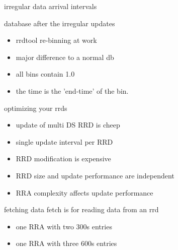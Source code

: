 \begin{frame}{irregular data arrival intervals}

\end{frame}


\begin{frame}{database after the irregular updates}



\begin{itemize}
\item rrdtool re-binning at work
\item major difference to a normal db
\item all bins contain 1.0
\item the time is the 'end-time' of the bin.
\end{itemize}
\end{frame}

\begin{frame}{optimizing your rrds}
\begin{itemize}
\item update of multi DS RRD is cheep
\item single update interval per RRD
\item RRD modification is expensive
\item RRD size and update performance are independent
\item RRA complexity affects update performance
\end{itemize}
\end{frame}



\begin{frame}{fetching data}
fetch is for reading data from an rrd

\begin{itemize}
\item one RRA with two 300s entries
\item one RRA with three 600s entries
\end{itemize}
\end{frame}

